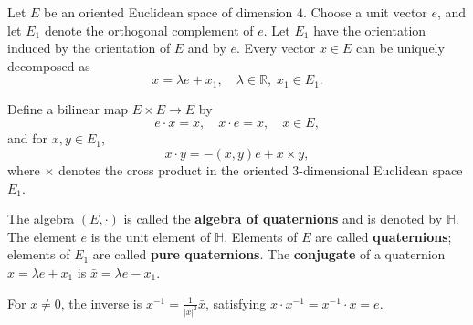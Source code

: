 Let $E$ be an oriented Euclidean space of dimension $4$. Choose a unit vector $e$, and let $E_1$ denote the orthogonal complement of $e$. Let $E_1$ have the orientation induced by the orientation of $E$ and by $e$. Every vector $x \in E$ can be uniquely decomposed as
$$x = \lambda e + x_1, \quad \lambda \in \mathbb{R}, \; x_1 \in E_1.$$

Define a bilinear map $E \times E \to E$ by
$$e \cdot x = x, \quad x \cdot e = x, \quad x \in E,$$
and for $x, y \in E_1$,
$$x \cdot y = -(x, y) e + x \times y,$$
where $\times$ denotes the cross product in the oriented $3$-dimensional Euclidean space $E_1$.

The algebra $(E, \cdot)$ is called the \textbf{algebra of quaternions} and is denoted by $\mathbb{H}$. The element $e$ is the unit element of $\mathbb{H}$. Elements of $E$ are called \textbf{quaternions}; elements of $E_1$ are called \textbf{pure quaternions}. The \textbf{conjugate} of a quaternion $x = \lambda e + x_1$ is $\bar{x} = \lambda e - x_1$.

For $x \neq 0$, the inverse is $x^{-1} = \frac{1}{|x|^2} \bar{x}$, satisfying $x \cdot x^{-1} = x^{-1} \cdot x = e$.
